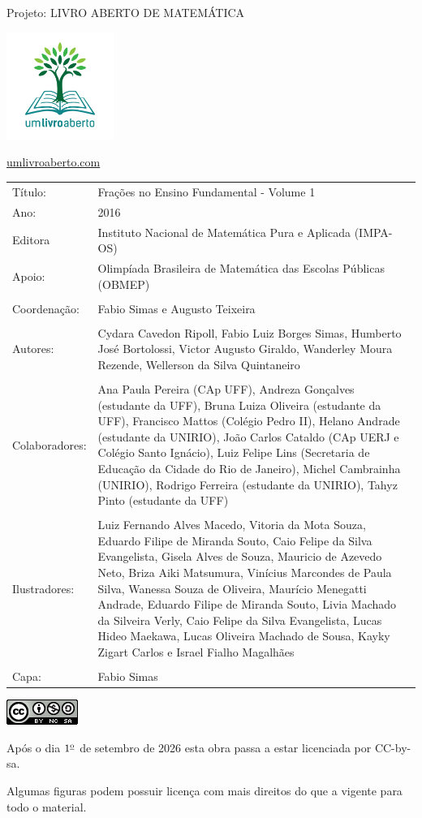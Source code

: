 \documentclass[A4]{report}
\begin{document}
\thispagestyle{empty}

\vspace{2cm}
\begin{center}
Projeto: LIVRO ABERTO DE MATEMÁTICA

\includegraphics[width=3.5cm]{logo.jpg}

\url{umlivroaberto.com}
\vspace{1cm}

\begin{tabular}{p{}p{}}
Título: & Frações no Ensino Fundamental - Volume 1\\
Ano: & 2016 \\
Editora & Instituto Nacional de Matem\'atica Pura e Aplicada (IMPA-OS)\\
Apoio:& Olimp\'iada Brasileira de Matem\'atica das Escolas P\'ublicas (OBMEP)\\
\\
Coordenação: & Fabio Simas e Augusto Teixeira\\
\\
Autores: & Cydara Cavedon Ripoll, Fabio Luiz Borges Simas, Humberto José Bortolossi, Victor Augusto Giraldo, Wanderley Moura Rezende, Wellerson  da Silva Quintaneiro\\
\\
Colaboradores: & Ana Paula Pereira (CAp UFF), Andreza Gonçalves (estudante da UFF), Bruna Luiza Oliveira (estudante da UFF), Francisco Mattos (Colégio Pedro II), Helano Andrade (estudante da UNIRIO), João Carlos Cataldo (CAp UERJ e Colégio Santo Ignácio), Luiz Felipe Lins (Secretaria de Educação da Cidade do Rio de Janeiro), Michel Cambrainha (UNIRIO), Rodrigo Ferreira (estudante da UNIRIO), Tahyz Pinto (estudante da UFF) \\
\\
Ilustradores: & Luiz Fernando Alves Macedo,
Vitoria da Mota Souza,
Eduardo Filipe de Miranda Souto,
Caio Felipe da Silva Evangelista,
Gisela Alves de Souza,
Mauricio de Azevedo Neto,
Briza Aiki Matsumura,
Vinícius Marcondes de Paula Silva,
Wanessa Souza de Oliveira,
Maurício Menegatti Andrade,
Eduardo Filipe de Miranda Souto,
Livia Machado da Silveira Verly,
Caio Felipe da Silva Evangelista,
Lucas Hideo Maekawa,
Lucas Oliveira Machado de Sousa,
Kayky Zigart Carlos e
Israel Fialho Magalhães\\
\\
Capa: & Fabio Simas
\end{tabular}
\vspace{2cm}
 
\includegraphics[scale=1]{cc}
\vspace{.3cm}

Após o dia $1^{\textrm{\underline{o}}}$ de setembro de 2026 esta obra passa a estar licenciada por CC-by-sa.

Algumas figuras podem possuir licença com mais direitos do que a vigente para todo o material.
\end{center}
\end{document}
